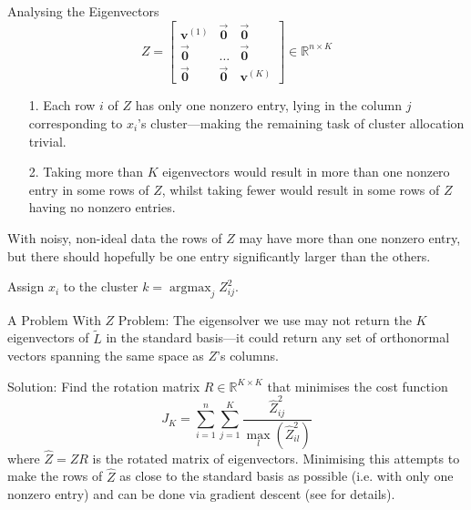 \documentclass[aspectratio=169]{beamer}
\DeclareMathOperator*{\argmax}{argmax} %
\begin{document}
\begin{frame}{Analysing the Eigenvectors}
  \[Z = \begin{bmatrix}
    \mathbf{v}^{(1)} & \overrightarrow{\mathbf{0}} &\overrightarrow{\mathbf{0}} \\
    \overrightarrow{\mathbf{0}}  & \hdots &  \overrightarrow{\mathbf{0}} \\
    \overrightarrow{\mathbf{0}} & \overrightarrow{\mathbf{0}} & \mathbf{v}^{(K)}
  \end{bmatrix} \in \mathbb{R}^{n \times K}\]
  
  \begin{itemize}
    \item[1.] Each row $i$ of $Z$ has only one nonzero entry, lying in the column $j$ corresponding to $x_i$'s cluster---making the remaining task of cluster allocation trivial.
    \pause
    \item[2.] Taking more than $K$ eigenvectors would result in more than one nonzero entry in some rows of $Z$, whilst taking fewer would result in some rows of $Z$ having no nonzero entries.
  \end{itemize}
  \pause
  With noisy, non-ideal data the rows of $Z$ may have more than one nonzero entry, but there should hopefully be one entry significantly larger than the others.
  
  Assign $x_i$ to the cluster $k = \argmax_j Z_{ij}^2$.
\end{frame}

\begin{frame}{A Problem With $Z$}
  \alert{Problem:} The eigensolver we use may not return the $K$ eigenvectors of $\tilde{L}$ in the standard basis---it could return any set of orthonormal vectors spanning the same space as $Z$'s columns.
  \pause

  \alert{Solution:} Find the rotation matrix $R \in \mathbb{R}^{K \times K}$ that minimises the cost function
  \[J_K = \sum_{i=1}^n \sum_{j=1}^K \frac{\hat{Z}_{ij}^2}{\max_l (\hat{Z}_{il}^2)}\]
  where $\hat{Z} = Z R$ is the rotated matrix of eigenvectors.%
  \pause
  \newline\newline
  Minimising this attempts to make the rows of $\hat{Z}$ as close to the standard basis as possible (i.e. with only one nonzero entry) and can be done via gradient descent (see \cite{zelnik-manor_self-tuning_2004} for details).
  
\end{frame}
\end{document}
